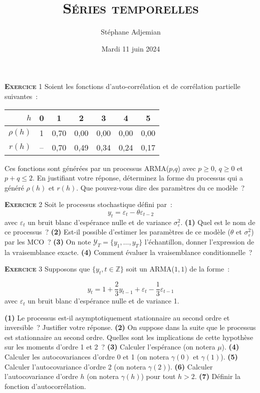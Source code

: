 \documentclass[10pt,a4paper,notitlepage,twocolumn]{article}
\newcommand{\exercice}[1]{\textsc{\textbf{Exercice}} #1}
\newcommand{\question}[1]{\textbf{(#1)}}
\begin{document}
\title{\textsc{Séries temporelles}}
\author{Stéphane Adjemian}
\date{Mardi 11 juin 2024}

\maketitle

\exercice{1} Soient les fonctions d'auto-corrélation et de corrélation
partielle suivantes~:
\begin{table}[H]
  \centering
  \begin{tabular}{r|cccccc}
    \hline\hline
    $h$ & 0 & 1 & 2 & 3 & 4 & 5 \\\hline
    $\rho (h)$ & 1 & 0,70 & 0,00 & 0,00 & 0,00 & 0,00\\
    $r (h)$ & -- & 0,70 & 0,49 & 0,34 & 0,24 & 0,17\\
    \hline\hline
  \end{tabular}
\end{table}
\noindent Ces  fonctions sont générées par  un processus ARMA($p$,$q$)
avec $p\geq 0$, $q\geq 0$ et $p+q \leq 2$. En
justifiant  votre réponse,  déterminez  la forme  du  processus qui  a
généré $\rho(h)$ et $r(h)$. Que pouvez-vous dire des paramètres du ce
modèle~?

\bigskip
\bigskip


\exercice{2} Soit le processus stochastique défini par~:
\[
  y_t = \varepsilon_t - \theta \varepsilon_{t-2}
\]
avec $\varepsilon_t$ un bruit blanc d'espérance nulle et de
variance $\sigma_{\varepsilon}^2$. \textbf{(1)} Quel est le nom de ce
processus~? \textbf{(2)} Est-il possible d'estimer les paramètres de
ce modèle ($\theta$ et $\sigma_{\varepsilon}^2$) par les MCO~?
\textbf{(3)} On note $\mathcal Y_T = \{y_1,\dots,y_T\}$ l'échantillon,
donner l'expression de la vraisemblance exacte. \textbf{(4)} Comment
évaluer la vraisemblance conditionnelle~?

\bigskip
\bigskip

\exercice{3} Supposons que $\{y_t,t\in\mathbb Z\}$ soit un ARMA($1,1$) de la forme~:

\[
y_t = 1 + \frac{2}{3}y_{t-1} + \varepsilon_t - \frac{1}{3} \varepsilon_{t-1}
\]
avec $\varepsilon_t$ un bruit blanc d'espérance nulle et de variance 1.\newline

\question{1} Le processus est-il asymptotiquement stationnaire au second ordre
et inversible~? Justifier votre réponse. \question{2} On suppose dans la suite
que le processus est stationnaire au second ordre. Quelles sont les implications
de cette hypothèse sur les moments d'ordre 1 et 2~? \question{3} Calculer
l'espérance (on notera $\mu$). \question{4} Calculer les autocovariances d'ordre
0 et 1 (on notera $\gamma(0)$ et $\gamma(1)$). \question{5} Calculer
l'autocovariance d'ordre 2 (on notera $\gamma(2)$). \question{6} Calculer
l'autocovariance d'ordre $h$ (on notera $\gamma(h)$) pour tout $h>2$.
\question{7} Définir la fonction d'autocorrélation.
\end{document}

